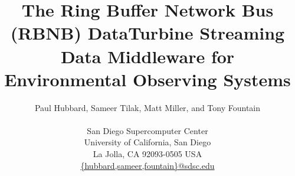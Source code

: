 \title{The Ring Buffer Network Bus (RBNB) DataTurbine Streaming Data Middleware for Environmental Observing Systems}


\author{Paul Hubbard, Sameer Tilak, Matt Miller, and Tony Fountain \\
 \begin{minipage}{80mm}
\begin{center}
       San Diego Supercomputer Center \\
 University of California, San Diego \\
 La Jolla, CA 92093-0505 USA \\
  \url{{hubbard,sameer,fountain}@sdsc.edu} \\
\end{center}
 \end{minipage}
 }
\maketitle